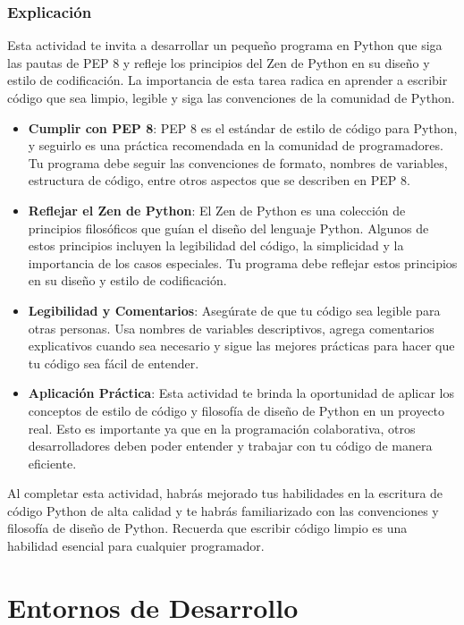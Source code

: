 \documentclass[
  a4paper,
  DIV=11,
  numbers=noendperiod,
  onepage,
  openany]{scrreprt}
\begin{document}
\subsection{Explicación}\label{explicaciuxf3n-2}

Esta actividad te invita a desarrollar un pequeño programa en Python que
siga las pautas de PEP 8 y refleje los principios del Zen de Python en
su diseño y estilo de codificación. La importancia de esta tarea radica
en aprender a escribir código que sea limpio, legible y siga las
convenciones de la comunidad de Python.

\begin{itemize}
\item
  \textbf{Cumplir con PEP 8}: PEP 8 es el estándar de estilo de código
  para Python, y seguirlo es una práctica recomendada en la comunidad de
  programadores. Tu programa debe seguir las convenciones de formato,
  nombres de variables, estructura de código, entre otros aspectos que
  se describen en PEP 8.
\item
  \textbf{Reflejar el Zen de Python}: El Zen de Python es una colección
  de principios filosóficos que guían el diseño del lenguaje Python.
  Algunos de estos principios incluyen la legibilidad del código, la
  simplicidad y la importancia de los casos especiales. Tu programa debe
  reflejar estos principios en su diseño y estilo de codificación.
\item
  \textbf{Legibilidad y Comentarios}: Asegúrate de que tu código sea
  legible para otras personas. Usa nombres de variables descriptivos,
  agrega comentarios explicativos cuando sea necesario y sigue las
  mejores prácticas para hacer que tu código sea fácil de entender.
\item
  \textbf{Aplicación Práctica}: Esta actividad te brinda la oportunidad
  de aplicar los conceptos de estilo de código y filosofía de diseño de
  Python en un proyecto real. Esto es importante ya que en la
  programación colaborativa, otros desarrolladores deben poder entender
  y trabajar con tu código de manera eficiente.
\end{itemize}

Al completar esta actividad, habrás mejorado tus habilidades en la
escritura de código Python de alta calidad y te habrás familiarizado con
las convenciones y filosofía de diseño de Python. Recuerda que escribir
código limpio es una habilidad esencial para cualquier programador.

\chapter{Entornos de Desarrollo}\label{entornos-de-desarrollo}
\end{document}

